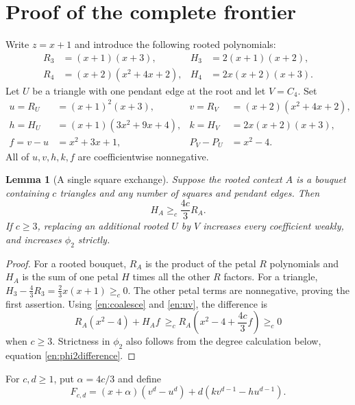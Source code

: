 \documentclass[12pt]{amsart}
\newtheorem{lem}[thm]{Lemma}
\theoremstyle{definition}
\theoremstyle{remark}
\numberwithin{equation}{section}
\begin{document}
\section{Proof of the complete frontier}
Write $z=x+1$ and introduce the following rooted polynomials:
\begin{align*}
 R_3&=(x+1)(x+3),&H_3&=2(x+1)(x+2),\\
 R_4&=(x+2)(x^2+4x+2),&H_4&=2x(x+2)(x+3).
\end{align*}
Let $U$ be a triangle with one pendant edge at the root and let $V=C_4$.
Set
\begin{align}
 u=R_U&=(x+1)^2(x+3),&v=R_V&=(x+2)(x^2+4x+2),\nonumber\\
 h=H_U&=(x+1)(3x^2+9x+4),&k=H_V&=2x(x+2)(x+3),\label{en:uv}\\
 f=v-u&=x^2+3x+1,&P_V-P_U&=x^2-4.\nonumber
\end{align}
All of $u,v,h,k,f$ are coefficientwise nonnegative.

\begin{lem}[A single square exchange]\label{en:exchange}
Suppose the rooted context $A$ is a bouquet containing $c$ triangles
and any number of squares and pendant edges. Then
\[
 H_A\ge_c\frac{4c}{3}R_A.
\]
If $c\ge3$, replacing an additional rooted $U$ by $V$ increases every
coefficient weakly, and increases $\phi_2$ strictly.
\end{lem}
\begin{proof}
For a rooted bouquet, $R_A$ is the product of the petal $R$ polynomials
and $H_A$ is the sum of one petal $H$ times all the other $R$ factors.
For a triangle,
$H_3-\frac43R_3=\frac23x(x+1)\ge_c0$.
The other petal terms are nonnegative, proving the first assertion.
Using \eqref{en:coalesce} and \eqref{en:uv}, the difference is
\[
 R_A(x^2-4)+H_Af
 \ \ge_c R_A\left(x^2-4+\frac{4c}{3}f\right)\ge_c0
\]
when $c\ge3$. Strictness in $\phi_2$ also follows from the degree
calculation below, equation \eqref{en:phi2difference}.
\end{proof}

For $c,d\ge1$, put $\alpha=4c/3$ and define
\begin{equation}\label{en:Fcd}
 F_{c,d}=(x+\alpha)(v^d-u^d)
                +d(kv^{d-1}-hu^{d-1}).
\end{equation}
\end{document}
